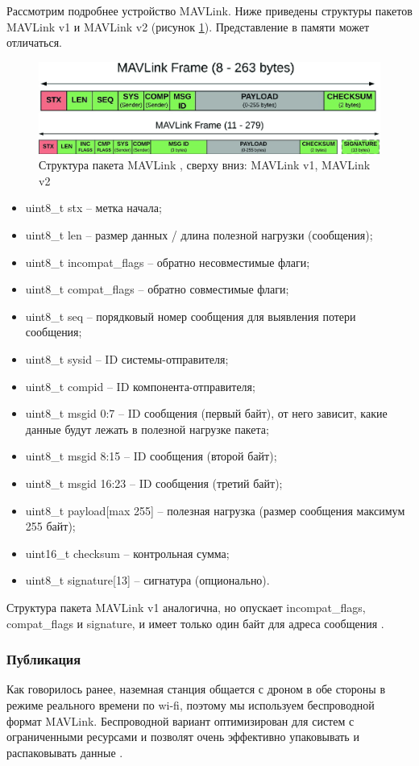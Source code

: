 Рассмотрим подробнее устройство MAVLink. Ниже приведены структуры пакетов MAVLink v1 и MAVLink v2 (рисунок \ref{fig:mavlink}). Представление в памяти может отличаться.
\begin{figure}[H]
	\centering
	\includegraphics[width=0.7\linewidth]{./pics/mavlink}
	\caption{Структура пакета MAVLink \cite{mavlink}, сверху вниз: MAVLink v1, MAVLink v2
	}
	\label{fig:mavlink} %
\end{figure}
\begin{itemize}
	\item uint8\_t stx -- метка начала;
	\item uint8\_t len -- размер данных / длина полезной нагрузки (сообщения);
	\item uint8\_t incompat\_flags -- обратно несовместимые флаги;
	\item uint8\_t compat\_flags -- обратно совместимые флаги;
	\item uint8\_t seq -- порядковый номер сообщения для выявления потери сообщения;
	\item uint8\_t sysid -- ID системы-отправителя;
	\item uint8\_t compid -- ID компонента-отправителя;
	\item uint8\_t msgid 0:7 -- ID сообщения (первый байт), от него зависит, какие данные будут лежать в полезной нагрузке пакета;
	\item uint8\_t msgid 8:15 -- ID сообщения (второй байт);
	\item uint8\_t msgid 16:23 -- ID сообщения (третий байт);
	\item uint8\_t payload[max 255] -- полезная нагрузка (размер сообщения максимум 255 байт);
	\item uint16\_t checksum -- контрольная сумма;
	\item uint8\_t signature[13] -- сигнатура (опционально).
\end{itemize}

Структура пакета MAVLink v1 аналогична, но опускает incompat\_flags, compat\_flags и signature, и имеет только один байт для адреса сообщения \cite{mavlink}.

\subsubsection{Публикация}
Как говорилось ранее, наземная станция общается с дроном в обе стороны в режиме реального времени по wi-fi, поэтому мы используем беспроводной формат MAVLink. Беспроводной вариант оптимизирован для систем с ограниченными ресурсами и позволят очень эффективно упаковывать и распаковывать данные \cite{mavlink}.

